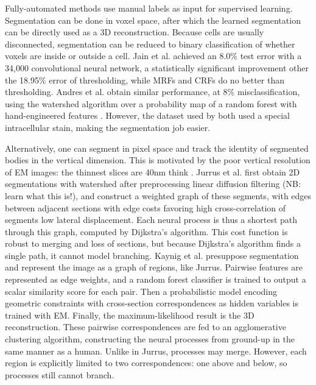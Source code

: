 \documentclass[draft,english]{article}
\newcommand{\+}[1]{\ensuremath{\boldsymbol{\mathrm{#1}}}}
\begin{document}
Fully-automated methods use manual labels as input for supervised learning. Segmentation can be done in voxel space, after which the learned segmentation can be directly used as a 3D reconstruction. Because cells are usually disconnected, segmentation can be reduced to binary classification of whether voxels are inside or outside a cell. Jain et al. \cite{Jain2007} achieved an 8.0\% test error with a 34,000 convolutional neural network, a statistically significant improvement other the 18.95\% error of thresholding, while MRFs and CRFs do no better than thresholding. Andres et al. obtain similar performance, at 8\% misclassification, using the watershed algorithm over a probability map of a random forest with hand-engineered features \cite{Andres2008, Gonzales2008}. However, the dataset used by both used a special intracellular stain, making the segmentation job easier.

Alternatively, one can segment in pixel space and track the identity of segmented bodies in the vertical dimension. This is motivated by the poor vertical resolution of EM images: the thinnest slices are 40nm think \cite{Kaynig2010b, Briggman2006}. Jurrus et al. \cite{Jurrus2008} first obtain 2D segmentations with watershed after preprocessing linear diffusion filtering (NB: learn what this is!), and construct a weighted graph of these segments, with edges between adjacent sections with edge costs favoring high cross-correlation of segments low lateral displacement. Each neural process is thus a shortest path through this graph, computed by Dijkstra's algorithm. This cost function is robust to merging and loss of sections, but because Dijkstra's algorithm finds a single path, it cannot model branching. Kaynig et al. \cite{Kaynig2010a} presuppose segmentation and represent the image as a graph of regions, like Jurrus. Pairwise features are represented as edge weights, and a random forest classifier is trained to output a scalar similarity score for each pair. Then a probabilistic model encoding geometric constraints with cross-section correspondences as hidden variables is trained with EM. Finally, the maximum-likelihood result is the 3D reconstruction. These pairwise correspondences are fed to an agglomerative clustering algorithm, constructing the neural processes from ground-up in the same manner as a human. Unlike in Jurrus, processes may merge. However, each region is explicitly limited to two correspondences: one above and below, so processes still cannot branch.
\end{document}
